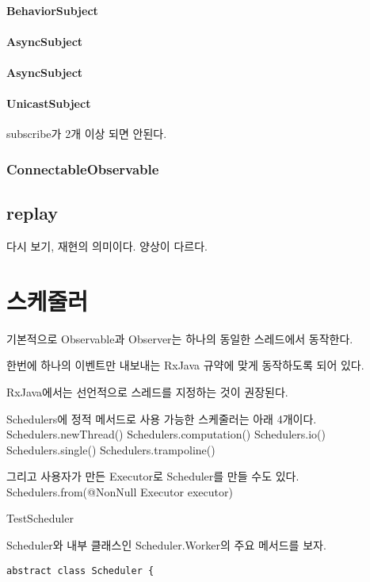 \documentclass{book}
\begin{document}
{\subsubsection{BehaviorSubject}

\subsubsection{AsyncSubject}

\subsubsection{AsyncSubject}

\subsubsection{UnicastSubject}
subscribe가 2개 이상 되면 안된다.

\subsection{ConnectableObservable}

\section{replay}
다시 보기, 재현의 의미이다. 양상이 다르다.

\chapter{스케줄러}
기본적으로 Observable과 Observer는 하나의 동일한 스레드에서 동작한다.

한번에 하나의 이벤트만 내보내는 RxJava 규약에 맞게 동작하도록 되어 있다.


RxJava에서는 선언적으로 스레드를 지정하는 것이 권장된다.

Schedulers에 정적 메서드로 사용 가능한 스케줄러는 아래 4개이다.
Schedulers.newThread()
Schedulers.computation()
Schedulers.io()
Schedulers.single()
Schedulers.trampoline()

그리고 사용자가 만든 Executor로 Scheduler를 만들 수도 있다.
Schedulers.from(@NonNull Executor executor)

TestScheduler

Scheduler와 내부 클래스인 Scheduler.Worker의 주요 메서드를 보자.
\begin{verbatim}
abstract class Scheduler {


\end{verbatim}}
\end{document}
